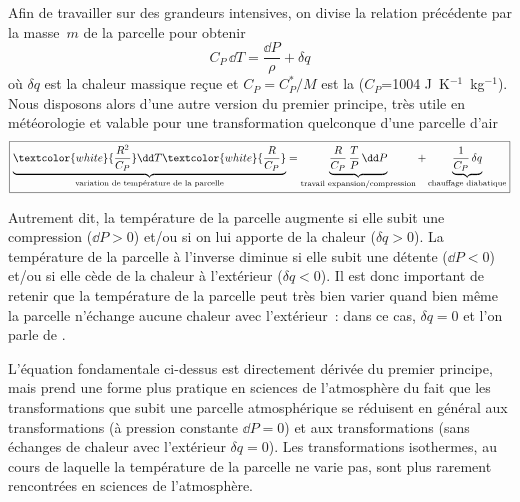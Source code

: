 \sk
Afin de travailler sur des grandeurs intensives, on divise la relation précédente par la masse~$m$ de la parcelle pour obtenir
\[ C_P \, \dd T = \frac{\dd P}{\rho} + \delta q \]
où $\delta q$ est la chaleur massique reçue et $C_P = C_P^* / M$ est la  ($C_P$=1004 J~K$^{-1}$~kg$^{-1}$). Nous disposons alors d'une autre version du premier principe, très utile en météorologie et valable pour une transformation quelconque d'une parcelle d'air
\[ \boxed{ \underbrace{\textcolor{white}{\frac{R^2}{C_P}} \dd T \textcolor{white}{\frac{R}{C_P}}}_{\text{variation de température de la parcelle}} = \underbrace{\frac{R}{C_P} \, \frac{T}{P} \, \dd P}_{\text{travail expansion/compression}} + \underbrace{\frac{1}{C_P} \, \delta q}_{\text{chauffage diabatique}} } \]

\sk
Autrement dit, la température de la parcelle augmente si elle subit une compression ($\dd P > 0$) et/ou si on lui apporte de la chaleur ($\delta q > 0$). La température de la parcelle à l'inverse diminue si elle subit une détente ($\dd P < 0$) et/ou si elle cède de la chaleur à l'extérieur ($\delta q < 0$). Il est donc important de retenir que la température de la parcelle peut très bien varier quand bien même la parcelle n'échange aucune chaleur avec l'extérieur~: dans ce cas, $\delta q = 0$ et l'on parle de . 

\sk
L'équation fondamentale ci-dessus est directement dérivée du premier principe, mais prend une forme plus pratique en sciences de l'atmosphère du fait que les transformations que subit une parcelle atmosphérique se réduisent en général aux transformations  (à pression constante $\dd P = 0$) et aux transformations  (sans échanges de chaleur avec l'extérieur $\delta q = 0$). Les transformations isothermes, au cours de laquelle la température de la parcelle ne varie pas, sont plus rarement rencontrées en sciences de l'atmosphère.


